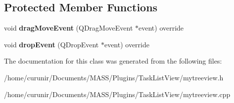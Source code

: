 \subsection*{Protected Member Functions}
\begin{DoxyCompactItemize}
\item 
void {\bfseries drag\+Move\+Event} (Q\+Drag\+Move\+Event $\ast$event) override\hypertarget{class_my_tree_view_afff3909f705a25758b55cc5ac0d9cf69}{}\label{class_my_tree_view_afff3909f705a25758b55cc5ac0d9cf69}

\item 
void {\bfseries drop\+Event} (Q\+Drop\+Event $\ast$event) override\hypertarget{class_my_tree_view_adba311eaf413fc319f875a43e8bc1bdb}{}\label{class_my_tree_view_adba311eaf413fc319f875a43e8bc1bdb}

\end{DoxyCompactItemize}


The documentation for this class was generated from the following files\+:\begin{DoxyCompactItemize}
\item 
/home/curunir/\+Documents/\+M\+A\+S\+S/\+Plugins/\+Task\+List\+View/mytreeview.\+h\item 
/home/curunir/\+Documents/\+M\+A\+S\+S/\+Plugins/\+Task\+List\+View/mytreeview.\+cpp\end{DoxyCompactItemize}

